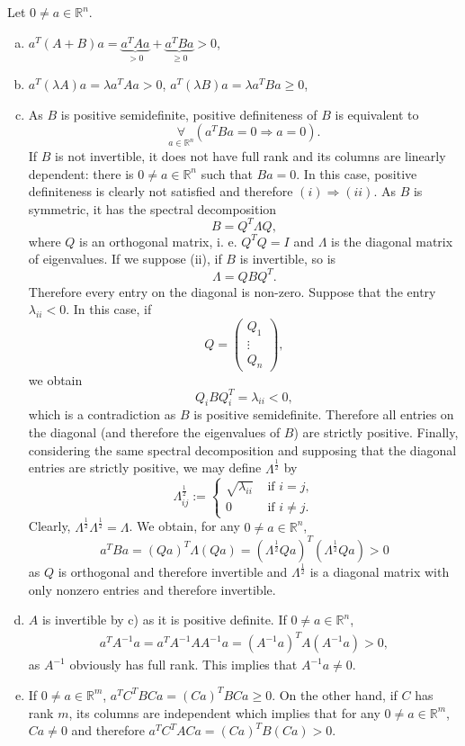 \documentclass[a4paper,11pt]{report}
\begin{document}
\begin{appendix}
\begin{Bew}
Let $0\ne a\in\mathbb{R}^n$.
\begin{enumerate}[a)]
\item
$a^T(A+B)a=\underbrace{a^TAa}_{>0}+\underbrace{a^TBa}_{\ge0}>0$,
\item
$a^T(\lambda A)a=\lambda a^TAa>0$, $a^T(\lambda B)a=\lambda a^TBa\ge0$, 
\item
As $B$ is positive semidefinite, positive definiteness of $B$ is equivalent to 
\[
\underset{a\in\mathbb{R}^n}{\forall}\left(a^TBa=0\Rightarrow a=0\right).
\]
If $B$ is not invertible, it does not have full rank and its columns are linearly dependent: there is $0\ne a\in\mathbb{R}^n$ such that $Ba=0$. In this case, positive definiteness is clearly not satisfied and therefore $(i)\Rightarrow (ii)$. As $B$ is symmetric, it has the spectral decomposition
\[
B=Q^T\Lambda Q,
\]
where $Q$ is an orthogonal matrix, i. e. $Q^TQ=I$ and $\Lambda$ is the diagonal matrix of eigenvalues. If we suppose (ii), if $B$ is invertible, so is 
\[
\Lambda=QBQ^T.
\]
Therefore every entry on the diagonal is non-zero. Suppose that the entry $\lambda_{ii}<0$. In this case, if
\[
Q=\begin{pmatrix}
Q_1\\\vdots\\Q_n
\end{pmatrix},
\]
we obtain
\[
Q_iBQ_i^T=\lambda_{ii}<0,
\]
which is a contradiction as $B$ is positive semidefinite. Therefore all entries on the diagonal (and therefore the eigenvalues of $B$) are strictly positive. Finally, considering the same spectral decomposition and supposing that the diagonal entries are strictly positive, we may define $\Lambda^{\frac12}$ by
\[
\Lambda^{\frac12}_{ij}:=\begin{cases}
\sqrt{\lambda_{ii}}&\text{ if }i=j,\\
0&\text{ if }i\ne j.
\end{cases}
\]
Clearly, $\Lambda^{\frac12}\Lambda^{\frac12}=\Lambda$. We obtain, for any $0\ne a\in\mathbb{R}^n$,
\[
a^TBa=(Qa)^T\Lambda(Qa)=(\Lambda^{\frac12}Qa)^T(\Lambda^{\frac12}Qa)>0
\]
as $Q$ is orthogonal and therefore invertible and $\Lambda^{\frac12}$ is a diagonal matrix with only nonzero entries and therefore invertible.
\item
$A$ is invertible by c) as it is positive definite. If $0\ne a\in\mathbb{R}^n$,
\begin{align*}
a^TA^{-1}a=a^TA^{-1}AA^{-1}a=(A^{-1}a)^TA(A^{-1}a)>0,
\end{align*}
as $A^{-1}$ obviously has full rank. This implies that $A^{-1}a\ne 0$.
\item
If $0\ne a\in\mathbb{R}^m$, $a^TC^TBCa=(Ca)^TBCa\ge0$. On the other hand, if $C$ has rank $m$, its columns are independent which implies that for any $0\ne a\in\mathbb{R}^m$, $Ca\ne 0$ and therefore $a^TC^TACa=(Ca)^TB(Ca)>0$.
\end{enumerate}
\end{Bew}


\end{appendix}
\end{document}
